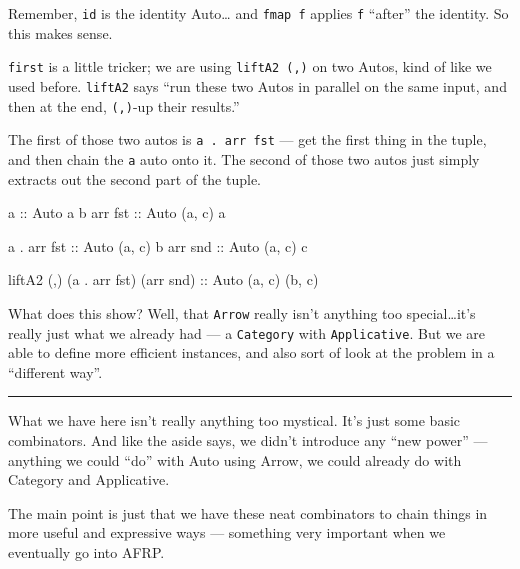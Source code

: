 \documentclass[]{article}
\newenvironment{Shaded}{}{}
\newcommand{\DataTypeTok}[1]{\textcolor[rgb]{0.56,0.13,0.00}{{#1}}}
\newcommand{\OtherTok}[1]{\textcolor[rgb]{0.00,0.44,0.13}{{#1}}}
\newcommand{\FunctionTok}[1]{\textcolor[rgb]{0.02,0.16,0.49}{{#1}}}
\newcommand{\NormalTok}[1]{{#1}}
\begin{document}
Remember, \texttt{id} is the identity Auto\ldots{} and \texttt{fmap\ f}
applies \texttt{f} ``after'' the identity. So this makes sense.

\texttt{first} is a little tricker; we are using \texttt{liftA2\ (,)} on
two Autos, kind of like we used before. \texttt{liftA2} says ``run these
two Autos in parallel on the same input, and then at the end,
\texttt{(,)}-up their results.''

The first of those two autos is \texttt{a\ .\ arr\ fst} --- get the
first thing in the tuple, and then chain the \texttt{a} auto onto it.
The second of those two autos just simply extracts out the second part
of the tuple.

\begin{Shaded}
\begin{Highlighting}[]
\OtherTok{a           ::} \DataTypeTok{Auto} \NormalTok{a b}
\NormalTok{arr}\OtherTok{ fst     ::} \DataTypeTok{Auto} \NormalTok{(a, c) a}

\NormalTok{a }\FunctionTok{.} \NormalTok{arr}\OtherTok{ fst ::} \DataTypeTok{Auto} \NormalTok{(a, c) b}
\NormalTok{arr}\OtherTok{ snd     ::} \DataTypeTok{Auto} \NormalTok{(a, c) c}

\NormalTok{liftA2 (,) (a }\FunctionTok{.} \NormalTok{arr fst) (arr snd)}\OtherTok{ ::} \DataTypeTok{Auto} \NormalTok{(a, c) (b, c)}
\end{Highlighting}
\end{Shaded}

What does this show? Well, that \texttt{Arrow} really isn't anything too
special\ldots{}it's really just what we already had --- a
\texttt{Category} with \texttt{Applicative}. But we are able to define
more efficient instances, and also sort of look at the problem in a
``different way''.

\begin{center}\rule{0.5\linewidth}{\linethickness}\end{center}

What we have here isn't really anything too mystical. It's just some
basic combinators. And like the aside says, we didn't introduce any
``new power'' --- anything we could ``do'' with Auto using Arrow, we
could already do with Category and Applicative.

The main point is just that we have these neat combinators to chain
things in more useful and expressive ways --- something very important
when we eventually go into AFRP.
\end{document}
